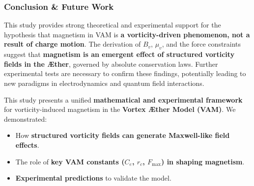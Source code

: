     \subsubsection*{Conclusion \& Future Work}
This study provides strong theoretical and experimental support for the hypothesis that magnetism in VAM is \textbf{a vorticity-driven phenomenon, not a result of charge motion}. The derivation of $B_v$, $\mu_v$, and the force constraints suggest that \textbf{magnetism is an emergent effect of structured vorticity fields in the \AE ther}, governed by absolute conservation laws. Further experimental tests are necessary to confirm these findings, potentially leading to new paradigms in electrodynamics and quantum field interactions.

    This study presents a unified \textbf{mathematical and experimental framework} for vorticity-induced magnetism in the \textbf{Vortex Æther Model (VAM)}. We demonstrated:
\begin{itemize}
    \item How \textbf{structured vorticity fields can generate Maxwell-like field effects}.
    \item The role of \textbf{key VAM constants (\( C_e \), \( r_c \), \( F_{\text{max}} \)) in shaping magnetism}.
    \item \textbf{Experimental predictions} to validate the model.
\end{itemize}
